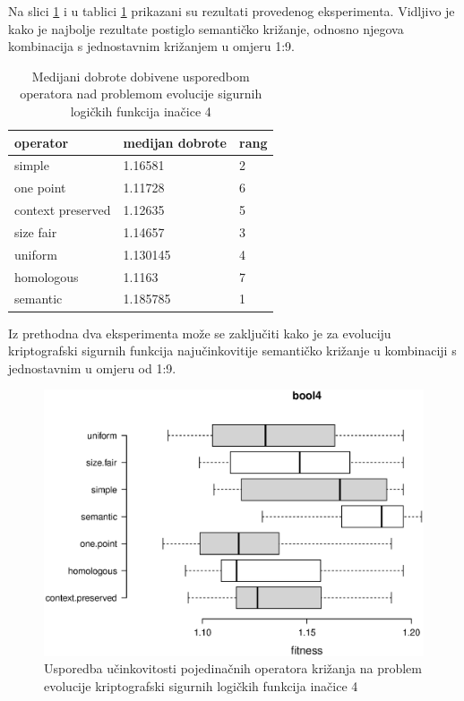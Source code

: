 Na slici \ref{bool4box} i u tablici \ref{bool4table} prikazani su rezultati provedenog eksperimenta. Vidljivo je kako je najbolje rezultate postiglo semantičko križanje, odnosno njegova kombinacija s jednostavnim križanjem u omjeru 1:9.

\begin{table}[H]
 	\centering
 \caption{Medijani dobrote dobivene usporedbom operatora nad problemom evolucije sigurnih logičkih funkcija inačice 4}
    \begin{tabular}{| l | l | l |}
    \hline
    \textbf{operator} & \textbf{medijan dobrote} & \textbf{rang}\\ \hline
    simple & 1.16581 & 2\\ \hline
    one point & 1.11728 & 6\\ \hline
    context preserved & 1.12635 & 5\\ \hline
    size fair & 1.14657 & 3\\ \hline
    uniform & 1.130145 & 4\\ \hline
    homologous & 1.1163 & 7\\ \hline
    semantic & 1.185785 & 1\\ \hline
    \end{tabular}
    
   
    \label{bool4table}
\end{table}


Iz prethodna dva eksperimenta može se zaključiti kako je za evoluciju kriptografski sigurnih funkcija najučinkovitije semantičko križanje u kombinaciji s jednostavnim u omjeru od 1:9.

\begin{figure}[H]
	\centering
	\includegraphics[trim=0cm 4cm 0cm 0cm, scale=0.6]{./slike/boxPlots/bool4.eps}
	\caption{Usporedba učinkovitosti pojedinačnih operatora križanja na problem evolucije kriptografski sigurnih logičkih funkcija inačice 4}
	\label{bool4box}
\end{figure}


